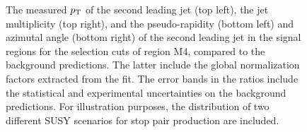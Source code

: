\begin{figure}[!ht]
\begin{center}
{    }
  \end{center}
  \caption[Kinematic distributions of the $\pt$ of the second leading jet, the jet multiplicity, and the pseudo-rapidity and azimutal angle of the second leading jet in the signal regions for the selection cuts of region M4, after the normalization factors extracted from the fit have been applied.]
{The measured $\pt$ of the second leading jet (top left), the jet multiplicity (top right), and the pseudo-rapidity (bottom left) and azimutal angle (bottom right) of the second leading jet in the signal regions for the selection cuts of region M4, compared to the background predictions. The latter include the global normalization factors extracted from the fit. The error bands in the ratios include the statistical and experimental uncertainties on the background predictions. For illustration purposes, the distribution of two different SUSY scenarios for stop pair production are included.}
  \label{fig:Plot_M4_SR_Jet2}
\end{figure}

